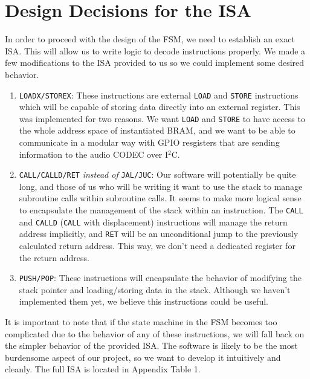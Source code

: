 \documentclass[conference]{IEEEtran}
\begin{document}
\section{Design Decisions for the ISA}
In order to proceed with the design of the FSM, we need to establish an exact ISA. This will allow us to write logic to decode instructions properly. We made a few modifications to the ISA provided to us so we could implement some desired behavior.
\begin{enumerate}
    \item \verb|LOADX/STOREX|: These instructions are external \verb|LOAD| and \verb|STORE| instructions which will be capable of storing data directly into an external register. This was implemented for two reasons. We want \verb|LOAD| and \verb|STORE| to have access to the whole address space of instantiated BRAM, and we want to be able to communicate in a modular way with GPIO resgisters that are sending information to the audio CODEC over I$^2$C.
    \item \verb|CALL/CALLD/RET| \textit{instead of} \verb|JAL/JUC|: Our software will potentially be quite long, and those of us who will be writing it want to use the stack to manage subroutine calls within subroutine calls. It seems to make more logical sense to encapsulate the management of the stack within an instruction. The \verb|CALL| and \verb|CALLD| (\verb|CALL| with displacement) instructions will manage the return address implicitly, and \verb|RET| will be an unconditional jump to the previously calculated return address. This way, we don't need a dedicated register for the return address.
    \item \verb|PUSH/POP|: These instructions will encapsulate the behavior of modifying the stack pointer and loading/storing data in the stack. Although we haven't implemented them yet, we believe this instructions could be useful.
\end{enumerate}
It is important to note that if the state machine in the FSM becomes too complicated due to the behavior of any of these instructions, we will fall back on the simpler behavior of the provided ISA. The software is likely to be the most burdensome aspect of our project, so we want to develop it intuitively and cleanly. The full ISA is located in Appendix Table 1.
\end{document}
